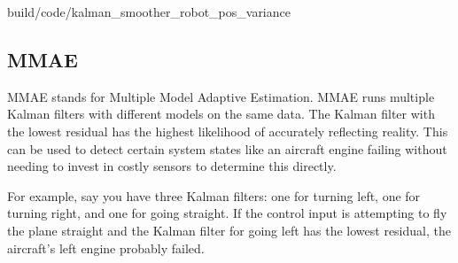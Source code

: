 \begin{svg}{build/code/kalman_smoother_robot_pos_variance}
  \caption{Robot position variance with Kalman smoother}
  \label{fig:smoother_robot_pos_variance}
\end{svg}

\subsection{MMAE}

MMAE stands for Multiple Model Adaptive Estimation. MMAE runs multiple Kalman
filters with different \glspl{model} on the same data. The Kalman filter with
the lowest residual has the highest likelihood of accurately reflecting reality.
This can be used to detect certain \gls{system} \glspl{state} like an aircraft
engine failing without needing to invest in costly sensors to determine this
directly.

For example, say you have three Kalman filters: one for turning left, one for
turning right, and one for going straight. If the \gls{control input} is
attempting to fly the plane straight and the Kalman filter for going left has
the lowest residual, the aircraft's left engine probably failed.
